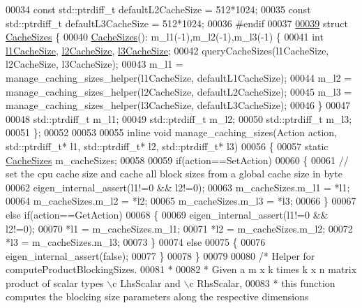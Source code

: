 \begin{DoxyCode}
00034 \textcolor{keyword}{const} std::ptrdiff\_t defaultL2CacheSize = 512*1024;
00035 \textcolor{keyword}{const} std::ptrdiff\_t defaultL3CacheSize = 512*1024;
00036 \textcolor{preprocessor}{#endif}
00037 
\hyperlink{struct_eigen_1_1internal_1_1_cache_sizes}{00039} \textcolor{keyword}{struct }\hyperlink{struct_eigen_1_1internal_1_1_cache_sizes}{CacheSizes} \{
00040   \hyperlink{struct_eigen_1_1internal_1_1_cache_sizes}{CacheSizes}(): m\_l1(-1),m\_l2(-1),m\_l3(-1) \{
00041     \textcolor{keywordtype}{int} \hyperlink{namespace_eigen_a2669f89ff38296a38e6d973552eb4e33}{l1CacheSize}, \hyperlink{namespace_eigen_a2cfc0330ba567d63a496be1cac8427ae}{l2CacheSize}, \hyperlink{namespace_eigen_ae2efa4852ea90c2d47b7dcec5b40ba2b}{l3CacheSize};
00042     queryCacheSizes(l1CacheSize, l2CacheSize, l3CacheSize);
00043     m\_l1 = manage\_caching\_sizes\_helper(l1CacheSize, defaultL1CacheSize);
00044     m\_l2 = manage\_caching\_sizes\_helper(l2CacheSize, defaultL2CacheSize);
00045     m\_l3 = manage\_caching\_sizes\_helper(l3CacheSize, defaultL3CacheSize);
00046   \}
00047 
00048   std::ptrdiff\_t m\_l1;
00049   std::ptrdiff\_t m\_l2;
00050   std::ptrdiff\_t m\_l3;
00051 \};
00052 
00053 
00055 \textcolor{keyword}{inline} \textcolor{keywordtype}{void} manage\_caching\_sizes(Action action, std::ptrdiff\_t* l1, std::ptrdiff\_t* l2, std::ptrdiff\_t* l3)
00056 \{
00057   \textcolor{keyword}{static} \hyperlink{struct_eigen_1_1internal_1_1_cache_sizes}{CacheSizes} m\_cacheSizes;
00058 
00059   \textcolor{keywordflow}{if}(action==SetAction)
00060   \{
00061     \textcolor{comment}{// set the cpu cache size and cache all block sizes from a global cache size in byte}
00062     eigen\_internal\_assert(l1!=0 && l2!=0);
00063     m\_cacheSizes.m\_l1 = *l1;
00064     m\_cacheSizes.m\_l2 = *l2;
00065     m\_cacheSizes.m\_l3 = *l3;
00066   \}
00067   \textcolor{keywordflow}{else} \textcolor{keywordflow}{if}(action==GetAction)
00068   \{
00069     eigen\_internal\_assert(l1!=0 && l2!=0);
00070     *l1 = m\_cacheSizes.m\_l1;
00071     *l2 = m\_cacheSizes.m\_l2;
00072     *l3 = m\_cacheSizes.m\_l3;
00073   \}
00074   \textcolor{keywordflow}{else}
00075   \{
00076     eigen\_internal\_assert(\textcolor{keyword}{false});
00077   \}
00078 \}
00079 
00080 \textcolor{comment}{/* Helper for computeProductBlockingSizes.}
00081 \textcolor{comment}{ *}
00082 \textcolor{comment}{ * Given a m x k times k x n matrix product of scalar types \(\backslash\)c LhsScalar and \(\backslash\)c RhsScalar,}
00083 \textcolor{comment}{ * this function computes the blocking size parameters along the respective dimensions}

\end{DoxyCode}

